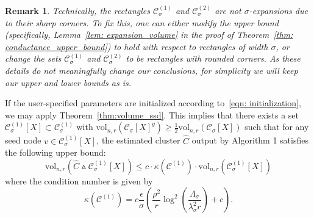 \documentclass[11pt,twoside]{article}
\newtheorem*{remark}{Remark}
\newcommand{\set}[1]{\left\{#1\right\}}
\newcommand{\vol}{\mathrm{vol}}
\newcommand{\1}{\mathbf{1}}
\newcommand{\dist}{\mathrm{dist}}
\newcommand{\Xbf}{X}             %
\newcommand{\Pbb}{\mathbb{P}}
\newcommand{\Cbb}{\mathbb{C}}
\newcommand{\Cset}{\mathcal{C}}
\newcommand{\Csig}{\Cset_{\sigma}}
\begin{document}

\begin{remark}Technically, the rectangles $\Csig^{(1)}$ and $\Csig^{(2)}$ are not $\sigma$-expansions due to their sharp corners. To fix this, one can either modify the upper bound (specifically, Lemma~\ref{lem: expansion_volume} in the proof of Theorem~\ref{thm: conductance_upper_bound}) to hold with respect to rectangles of width $\sigma$, or change the sets $\Csig^{(1)}$ and $\Csig^{(2)}$ to be rectangles with rounded corners. As these details do not meaningfully change our conclusions, for simplicity we will keep our upper and lower bounds as is.
\end{remark}

If the user-specified parameters are initialized according to~\eqref{eqn: initialization}, we may apply Theorem~\ref{thm:volume_ssd}. This implies that there exists a set $\Csig^{(1)}[\Xbf] \subset \Csig^{(1)}$ with $\vol_{n,r}(\Csig[\Xbf]^g) \geq \frac{1}{2}\vol_{n,r}(\Csig[\Xbf])$ such that for any seed node $v \in \Csig^{(1)}[\Xbf]$, the estimated cluster $\widehat{C}$ output by Algorithm 1 satisfies the following upper bound:
\begin{equation*}
\vol_{n,r}(\widehat{C} \vartriangle \Csig^{(1)}[\Xbf]) \leq c \cdot \kappa(\Cset^{(1)}) \cdot \vol_{n,r}(\Csig^{(1)}[\Xbf])
\end{equation*}
where the condition number is given by
\begin{equation*}
\kappa(\Cset^{(1)}) = c \frac{\epsilon}{\sigma}\left(\frac{\rho^2}{r}\log^2\left(\frac{\Lambda_{\sigma}}{\lambda_{\sigma}^2r}\right) + c\right).
\end{equation*}
\end{document}
